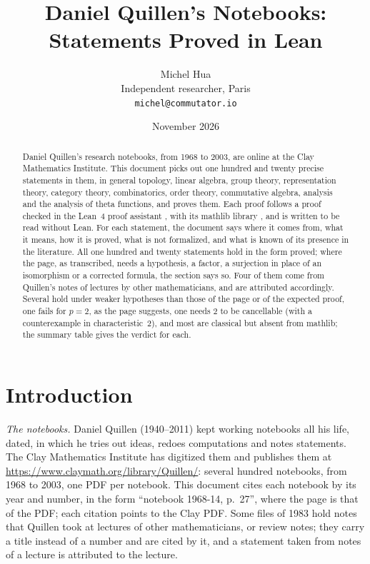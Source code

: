 \documentclass[11pt]{article}
\title{\Large Daniel Quillen's Notebooks: Statements Proved in Lean}
\author{Michel Hua\\ \small Independent researcher, Paris\\ \small \texttt{michel@commutator.io}}
\date{\small November 2026}
\newcommand{\q}[1]{“#1”}
\theoremstyle{plain}
\theoremstyle{definition}
\theoremstyle{remark}
\renewcommand{\_}{\bkunderscore\allowbreak}
\begin{document}
\maketitle

\begin{abstract}
\noindent Daniel Quillen's research notebooks, from 1968 to 2003, are online at the Clay Mathematics Institute. This document picks out one hundred and twenty precise statements in them, in general topology, linear algebra, group theory, representation theory, category theory, combinatorics, order theory, commutative algebra, analysis and the analysis of theta functions, and proves them. Each proof follows a proof checked in the Lean~4 proof assistant \cite{lean4}, with its mathlib library \cite{mathlib2020}, and is written to be read without Lean. For each statement, the document says where it comes from, what it means, how it is proved, what is not formalized, and what is known of its presence in the literature. All one hundred and twenty statements hold in the form proved; where the page, as transcribed, needs a hypothesis, a factor, a surjection in place of an isomorphism or a corrected formula, the section says so. Four of them come from Quillen's notes of lectures by other mathematicians, and are attributed accordingly. Several hold under weaker hypotheses than those of the page or of the expected proof, one fails for $p = 2$, as the page suggests, one needs $2$ to be cancellable (with a counterexample in characteristic~$2$), and most are classical but absent from mathlib; the summary table gives the verdict for each.
\end{abstract}

\tableofcontents

\section*{Introduction}

\emph{The notebooks.} Daniel Quillen (1940--2011) kept working notebooks all his life, dated, in which he tries out ideas, redoes computations and notes statements. The Clay Mathematics Institute has digitized them and publishes them at \url{https://www.claymath.org/library/Quillen/}: several hundred notebooks, from 1968 to 2003, one PDF per notebook. This document cites each notebook by its year and number, in the form \q{notebook 1968-14, p.~27}, where the page is that of the PDF; each citation points to the Clay PDF. Some files of 1983 hold notes that Quillen took at lectures of other mathematicians, or review notes; they carry a title instead of a number and are cited by it, and a statement taken from notes of a lecture is attributed to the lecture.
\end{document}

